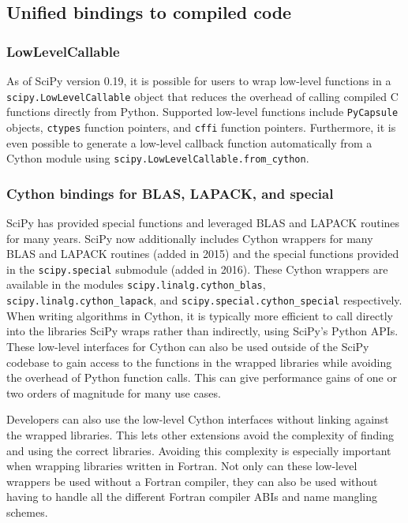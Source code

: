 \documentclass[fleqn,10pt]{wlscirep}
\begin{document}


\subsection*{Unified bindings to compiled code}

\subsubsection*{LowLevelCallable}

As of SciPy version 0.19, it is possible for users to wrap low-level functions
in a \texttt{scipy.LowLevelCallable} object that reduces the overhead of
calling compiled C functions directly from Python.  
Supported low-level functions include \texttt{PyCapsule} 
objects, \texttt{ctypes} function pointers, and \texttt{cffi} function pointers. 
Furthermore, it is even possible to generate a low-level callback function 
automatically from a Cython module using \texttt{scipy.LowLevelCallable.from\_cython}.

\subsubsection*{Cython bindings for BLAS, LAPACK, and special}

SciPy has provided special functions and leveraged BLAS and
LAPACK\cite{LAPACK} routines for many years. SciPy now additionally
includes Cython\cite{behnel2011cython} wrappers for
many BLAS and LAPACK routines (added in 2015) and the special functions 
provided in the \texttt{scipy.{\allowbreak}special} submodule (added in 2016).  
These Cython wrappers are available in the modules
\texttt{scipy.{\allowbreak}linalg.{\allowbreak}cython\_blas},
\texttt{scipy.{\allowbreak}linalg.{\allowbreak}cython\_lapack}, and
\texttt{scipy.{\allowbreak}special.{\allowbreak}cython\_special} respectively.
When writing algorithms in Cython, it is typically more efficient to call
directly into the libraries SciPy wraps rather than indirectly, using SciPy's
Python APIs.  These low-level interfaces for Cython can also be used outside of
the SciPy codebase to gain access to the functions in the wrapped libraries
while avoiding the overhead of Python function calls.  This can give
performance gains of one or two orders of magnitude for many use cases.

Developers can also use the low-level Cython interfaces without linking against
the wrapped libraries\cite{blas-lapack-wrappers-scipy-2015}.  This lets other
extensions avoid the complexity of finding and using the correct libraries.
Avoiding this complexity is especially important when wrapping libraries
written in Fortran.  Not only can these low-level wrappers be used without a
Fortran compiler, they can also be used without having to handle all the
different Fortran compiler ABIs and name mangling schemes.
\end{document}
